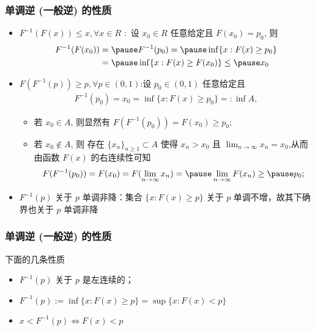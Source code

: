 


 \begin{frame}
	 \frametitle{单调逆 (一般逆) 的性质}

	 \begin{itemize}[<+-|alert@+>]
		 \item $F^{-1}(F (x))\leq x, \forall x\in R$ :\pause\  设 $x_0\in R$ 任意给定且 $F (x_0)=p_0$, 则 \pause
		 \begin{align*}
		  F^{-1}(F(x_0))&=\pause F^{-1}(p_0)=\pause \inf\{x: F(x)\geq p_0\}\\
		  &=\pause \inf\{x: F(x)\geq F(x_0)\}\leq\pause  x_0
		 \end{align*}
		 \item $F (F^{-1}(p))\geq p, \forall p\in (0,1)$:\pause 设 $p_0\in (0,1)$ 任意给定且
		 \begin{align*}
		 F^{-1}(p_0)=x_0=\inf\{x: F(x)\geq p_0\}=:\inf A, %
		 \end{align*}
	 \begin{itemize}[<+-|alert@+>]
		 \item 若 $x_0\in A$, 则显然有 $F (F^{-1}(p_0))=F (x_0)\geq p_0$;
		 \item 若 $x_0\notin A$, 则 \pause 存在 $\{x_n\}_{n\geq 1}\subset A$ 使得 $x_n>x_0$ 且 $\lim_{n\rightarrow \infty} x_n=x_0$,\pause  从而由函数 $F (x)$ 的右连续性可知 \pause
		 \[F(F^{-1}(p_0))=F(x_0)=F(\lim_{n\rightarrow \infty}x_n)=\pause \lim_{n\rightarrow \infty}F(x_n)\geq\pause p_0;\]
	 \end{itemize}
	 \item $F^{-1}(p)$ 关于 $p$ 单调非降：集合 $\{x:F (x)\geq p\}$ 关于 $p$ 单调不增，故其下确界也关于 $p$ 单调非降
		 \end{itemize}
	 \end{frame}

 \begin{frame}
	 \frametitle{单调逆 (一般逆) 的性质}
	 下面的几条性质 %
	 \begin{itemize}[<+-|alert@+>]
		 \item  $F^{-1}(p)$ 关于 $p$ 是左连续的；
		 \item $F^{-1}(p):=\inf\{x: F(x)\geq p\}=\sup\{x:F(x)<p\}$
		 \item $x<F^{-1}(p)\Leftrightarrow F(x)<p$
	 \end{itemize}

 \end{frame}

